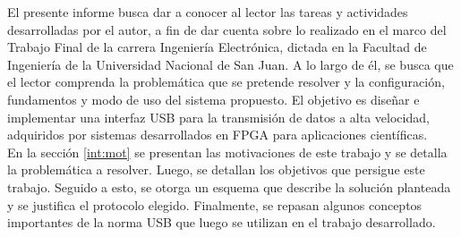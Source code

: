 El presente informe busca dar a conocer al lector las tareas y actividades desarrolladas por el autor, a fin de dar cuenta sobre lo realizado en el marco del Trabajo Final de la carrera Ingeniería Electrónica, dictada en la Facultad de Ingeniería de la Universidad Nacional de San Juan. A lo largo de él, se busca que el lector comprenda la problemática que se pretende resolver y la configuración, fundamentos y modo de uso del sistema propuesto. El objetivo es diseñar e implementar una interfaz USB para la transmisión de datos a alta velocidad, adquiridos por sistemas desarrollados en FPGA para aplicaciones científicas.\\


En la sección \ref{int:mot} se presentan las motivaciones de este trabajo y se detalla la problemática a resolver. Luego, se detallan los objetivos que persigue este trabajo. Seguido a esto, se otorga un esquema que describe la solución planteada y se justifica el protocolo elegido. Finalmente, se repasan algunos conceptos importantes de la norma USB que luego se utilizan en el trabajo desarrollado.\\ 
